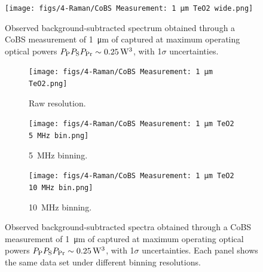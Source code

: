 \begin{figure}[t]
  \centering
  \hspace{-2em}\texttt{[image: figs/4-Raman/CoBS Measurement: 1 μm TeO2 wide.png]}
  \caption[Observed background-subtracted spectrum obtained through a \ac{CoBS} measurement of \SI{1}{\micro\meter} of .]{Observed background-subtracted spectrum obtained through a \ac{CoBS} measurement of \SI{1}{\micro\meter} of  captured at maximum operating optical powers \(P_{\rm P}P_{\rm S}P_{\rm Pr} \sim \SI{0.25}{\cubic\watt}\), with 1\(\sigma\) uncertainties.}
  \label{fig:Raman:1umTeO2}
\end{figure}

\begin{figure}[th!]
  \centering
  \begin{subfigure}[b]{0.85\textwidth}
    \centering
    \hspace{-2em}\texttt{[image: figs/4-Raman/CoBS Measurement: 1 μm TeO2.png]}
    \caption{Raw resolution.}
    \label{fig:Raman:1umTeO2Raw}
  \end{subfigure}

  \vspace{1em}

  \begin{subfigure}[b]{0.49\textwidth}
    \centering
    \texttt{[image: figs/4-Raman/CoBS Measurement: 1 μm TeO2 5 MHz bin.png]}
    \caption{\SI{5}{\mega\hertz} binning.}
    \label{fig:Raman:1umTeO25MHzBin}
  \end{subfigure}
  \hfill
  \begin{subfigure}[b]{0.49\textwidth}
    \centering
    \texttt{[image: figs/4-Raman/CoBS Measurement: 1 μm TeO2 10 MHz bin.png]}
    \caption{\SI{10}{\mega\hertz} binning.}
    \label{fig:Raman:1umTeO10MHzBin}
  \end{subfigure}

  \caption[Observed background-subtracted spectra obtained through a \ac{CoBS} measurement of \SI{1}{\micro\meter} of .]{Observed background-subtracted spectra obtained through a \ac{CoBS} measurement of \SI{1}{\micro\meter} of  captured at maximum operating optical powers \(P_{\rm P}P_{\rm S}P_{\rm Pr} \sim \SI{0.25}{\cubic\watt}\), with 1\(\sigma\) uncertainties. Each panel shows the same data set under different binning resolutions.}
  \label{fig:Raman:1umTeO2_combined}
\end{figure}

